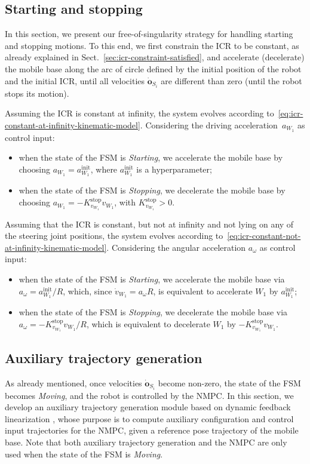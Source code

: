 \subsection{Starting and stopping}
\label{sec:starting-and-stopping}
In this section, we present our free-of-singularity strategy for handling starting and stopping motions. To this end, we first constrain the ICR to be constant, as already explained in Sect.~\ref{sec:icr-constraint-satisfied}, and accelerate (decelerate) the mobile base along the arc of circle defined by the initial position of the robot and the initial ICR, until all velocities $\dot{\bm{o}}_{S_i}$ are different than zero (until the robot stops its motion).

Assuming the ICR is constant at infinity, the system evolves according to~\eqref{eq:icr-constant-at-infinity-kinematic-model}. Considering the driving acceleration~$a_{W_1}$ as control input:
\begin{itemize}
    \item when the state of the FSM is \textit{Starting}, we accelerate the mobile base by choosing $a_{W_1} = a_{W_1}^{\mathrm{init}}$, where $a_{W_1}^{\mathrm{init}}$ is a hyperparameter;
    \item when the state of the FSM is \textit{Stopping}, we decelerate the mobile base by choosing $a_{W_1} = -K_{v_{W_1}}^{\mathrm{stop}} v_{W_1}$, with $K_{v_{W_1}}^{\mathrm{stop}} > 0$.
\end{itemize}

Assuming that the ICR is constant, but not at infinity and not lying on any of the steering joint positions, the system evolves according to~\eqref{eq:icr-constant-not-at-infinity-kinematic-model}.
Considering the angular acceleration $a_{\omega}$ as control input:
\begin{itemize}
    \item when the state of the FSM is \textit{Starting}, we accelerate the mobile base via $a_{\omega} = a_{W_1}^{\mathrm{init}} / R$, which, since $\dot{v}_{W_1}=a_{\omega} R$, is equivalent to accelerate $W_1$ by $a_{W_1}^{\mathrm{init}}$;
    \item when the state of the FSM is \textit{Stopping}, we decelerate the mobile base via $a_{\omega} = -K_{v_{W_1}}^{\mathrm{stop}} v_{W_1} / R$, which is equivalent to decelerate $W_1$ by $-K_{v_{W_1}}^{\mathrm{stop}} v_{W_1}$.
\end{itemize}

\subsection{Auxiliary trajectory generation}
As already mentioned, once velocities $\dot{\bm{o}}_{S_i}$ become non-zero, the state of the FSM becomes \textit{Moving}, and the robot is controlled by the NMPC. In this section, we develop an auxiliary trajectory generation module based on dynamic feedback linearization \cite{Oriolo2002WMRControlDFL}, whose purpose is to compute auxiliary configuration and control input trajectories for the NMPC, given a reference pose trajectory of the mobile base. Note that both auxiliary trajectory generation and the NMPC are only used when the state of the FSM is \textit{Moving}.

